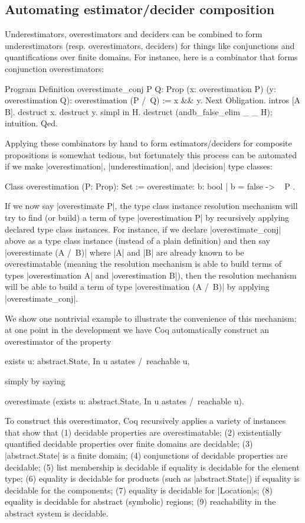 \documentclass[runningheads]{llncs}
\begin{document}
\subsection{Automating estimator/decider composition}

Underestimators, overestimators and deciders can be combined to form underestimators (resp. overestimators, deciders) for things like conjunctions and quantifications over finite domains. For instance, here is a combinator that forms conjunction overestimators:

\begin{code}
Program Definition overestimate_conj {P Q: Prop}
  (x: overestimation P) (y: overestimation Q):
    overestimation (P /\ Q) := x && y.
Next Obligation.
  intros [A B].
  destruct x. destruct y.
  simpl in H.
  destruct (andb_false_elim _ _ H); intuition.
Qed.
\end{code}
Applying these combinators by hand to form estimators/deciders for composite propositions is somewhat tedious, but fortunately this process can be automated if we make |overestimation|, |underestimation|, and |decision| type classes:

\begin{code}
Class overestimation (P: Prop): Set
  := overestimate: { b: bool | b = false -> ~ P }.
\end{code}
If we now say |overestimate P|, the type class instance resolution mechanism will try to find (or build) a term of type |overestimation P| by recursively applying declared type class instances. For instance, if we declare |overestimate_conj| above as a type class instance (instead of a plain definition) and then say |overestimate (A /\ B)| where |A| and |B| are already known to be overestimatable (meaning the resolution mechanism is able to build terms of types |overestimation A| and |overestimation B|), then the resolution mechanism will be able to build a term of type |overestimation (A /\ B)| by applying |overestimate_conj|.

We show one nontrivial example to illustrate the convenience of this mechanism: at one point in the development we have Coq automatically construct an overestimator of the property
\begin{code}
  exists u: abstract.State, In u astates /\ reachable u,
\end{code}
simply by saying
\begin{code}
  overestimate (exists u: abstract.State, In u astates /\ reachable u).
\end{code}
To construct this overestimator, Coq recursively applies a variety of instances that show that (1) decidable properties are overestimatable; (2) existentially quantified decidable properties over finite domains are decidable; (3) |abstract.State| is a finite domain; (4) conjunctions of decidable properties are decidable; (5) list membership is decidable if equality is decidable for the element type; (6) equality is decidable for products (such as |abstract.State|) if equality is decidable for the components; (7) equality is decidable for |Location|s; (8) equality is decidable for abstract (symbolic) regions; (9) reachability in the abstract system is decidable.
\end{document}
